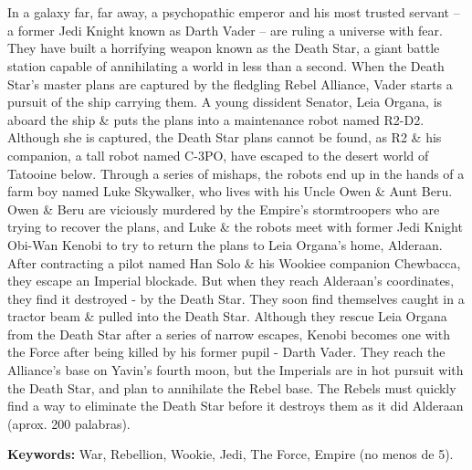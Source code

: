 \chapter*{\runtitle}

\noindent In a galaxy far, far away, a psychopathic emperor and his most trusted servant -- a former Jedi Knight known as Darth Vader -- are ruling a universe with fear. They have built a horrifying weapon known as the Death Star, a giant battle station capable of annihilating a world in less than a second. When the Death Star's master plans are captured by the fledgling Rebel Alliance, Vader starts a pursuit of the ship carrying them. A young dissident Senator, Leia Organa, is aboard the ship \& puts the plans into a maintenance robot named R2-D2. Although she is captured, the Death Star plans cannot be found, as R2 \& his companion, a tall robot named C-3PO, have escaped to the desert world of Tatooine below. Through a series of mishaps, the robots end up in the hands of a farm boy named Luke Skywalker, who lives with his Uncle Owen \& Aunt Beru. Owen \& Beru are viciously murdered by the Empire's stormtroopers who are trying to recover the plans, and Luke \& the robots meet with former Jedi Knight Obi-Wan Kenobi to try to return the plans to Leia Organa's home, Alderaan. After contracting a pilot named Han Solo \& his Wookiee companion Chewbacca, they escape an Imperial blockade. But when they reach Alderaan's coordinates, they find it destroyed - by the Death Star. They soon find themselves caught in a tractor beam \& pulled into the Death Star. Although they rescue Leia Organa from the Death Star after a series of narrow escapes, Kenobi becomes one with the Force after being killed by his former pupil - Darth Vader. They reach the Alliance's base on Yavin's fourth moon, but the Imperials are in hot pursuit with the Death Star, and plan to annihilate the Rebel base. The Rebels must quickly find a way to eliminate the Death Star before it destroys them as it did Alderaan (aprox. 200 palabras).

\bigskip

\noindent\textbf{Keywords:} War, Rebellion, Wookie, Jedi, The Force, Empire (no menos de 5).
